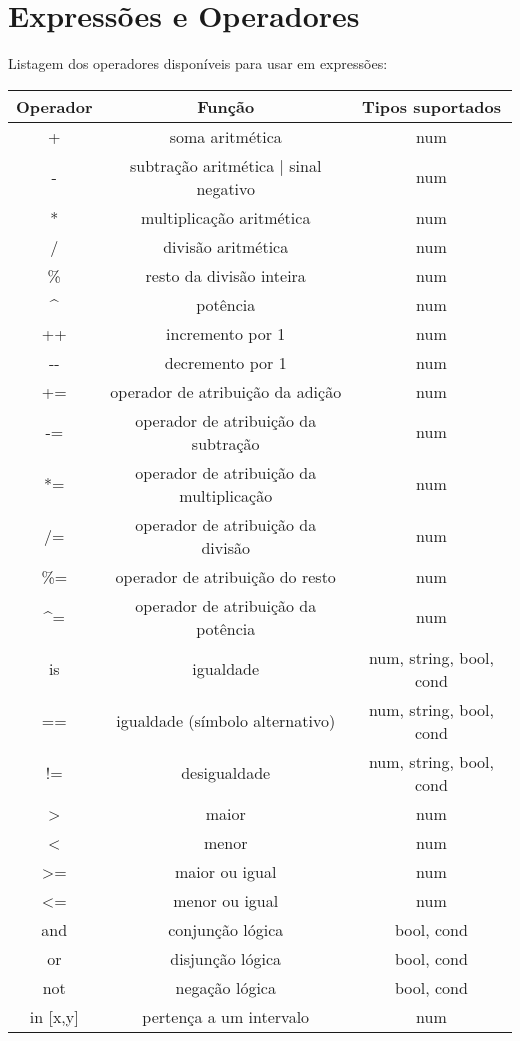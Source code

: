 \documentclass{report}
\begin{document}
\section{Expressões e Operadores}

Listagem dos operadores disponíveis para usar em expressões:

\begin{center}
\begin{tabular}{| c | c | c |}
  \hline
  \textbf{Operador} & \textbf{Função} & \textbf{Tipos suportados}\\
  \hline
  + & soma aritmética & num\\
  \hline
  - & subtração aritmética | sinal negativo & num\\
  \hline
  * & multiplicação aritmética & num\\
  \hline
  / & divisão aritmética & num\\
  \hline
  \% & resto da divisão inteira & num\\
  \hline
  \^{} & potência & num\\
  \hline
  ++ &  incremento por 1 & num\\
  \hline
  -{}- & decremento por 1 & num\\
  \hline
  += & operador de atribuição da adição & num\\
  \hline
  -= & operador de atribuição da subtração & num\\
  \hline
  *= & operador de atribuição da multiplicação & num\\
  \hline
  /= & operador de atribuição da divisão & num\\
  \hline
  \%= & operador de atribuição do resto & num\\
  \hline
  \^{}= & operador de atribuição da potência & num\\
  \hline
  is & igualdade & num, string, bool, cond\\
  \hline
  == & igualdade (símbolo alternativo) & num, string, bool, cond\\
  \hline
  != & desigualdade & num, string, bool, cond\\
  \hline
  > & maior & num\\
  \hline
  < & menor & num\\
  \hline
  >= & maior ou igual & num\\
  \hline
  <= & menor ou igual & num\\
  \hline
  and & conjunção lógica & bool, cond\\
  \hline
  or & disjunção lógica & bool, cond\\
  \hline
  not & negação lógica & bool, cond\\
  \hline
  in [x,y] & pertença a um intervalo & num\\
  \hline
  \end{tabular}
\end{center}
\end{document}

